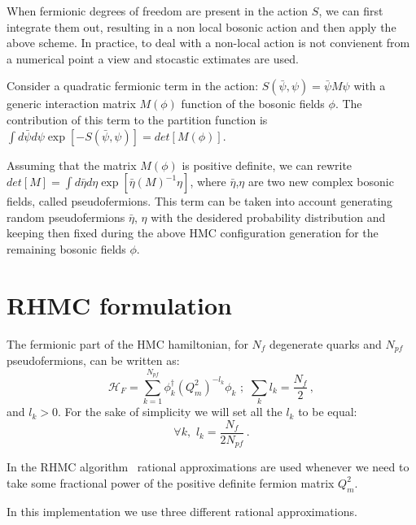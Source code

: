 \documentclass{article}[12pt]
\begin{document}
When fermionic degrees of freedom are present in the action $S$, we can first integrate them out, resulting in a non
local bosonic action and then apply the above scheme. In practice, to deal with a non-local action is not convienent
from a numerical point a view and stocastic extimates are used.

Consider a quadratic fermionic term  in the action: $S(\bar\psi,\psi) = \bar\psi M \psi$ with a generic interaction
matrix $M(\phi)$ function of the bosonic fields $\phi$. The contribution of this term to the partition function
is $\int d\bar\psi d\psi \exp [ -S(\bar\psi,\psi)] = det[M(\phi)]$. 

Assuming that the matrix $M(\phi)$ is positive definite,
we can rewrite $det[M]=\int d\bar\eta d\eta \exp[ \bar\eta (M)^{-1} \eta ]$, where $\bar\eta$,$\eta$ are two new 
complex bosonic fields, called pseudofermions.
This term can be taken into account generating random pseudofermions $\bar\eta$, $\eta$ with the desidered probability
distribution and keeping then fixed during the above HMC configuration generation for the remaining bosonic fields $\phi$.



\section{RHMC formulation}

The fermionic part of the HMC hamiltonian, for $N_f$ degenerate 
quarks and $N_{pf}$ pseudofermions, can be written as:
%
\begin{equation}
\mathcal{H}_F = \sum_{k=1}^{N_{pf}} \phi_k^\dagger ( Q_m^2 )^{-l_k} \phi_k \,\, ;\,\, \sum_k l_k = \frac{N_f}{2}\, , \label{HFN}
\end{equation}
and $l_k>0$. For the sake of simplicity we will set all the $l_k$ to be equal:
\begin{equation}
\forall k,\,\, l_k = \frac{N_f}{2N_{pf}}\, .
\end{equation}

In the RHMC algorithm~\cite{Clark:2005sq} rational approximations are used whenever we need to take some 
fractional power of the positive definite fermion matrix $Q_m^2$.

In this implementation we use three different rational approximations.
\end{document}
